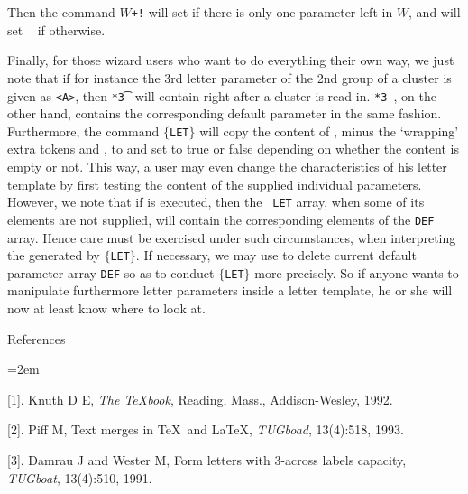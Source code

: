 {{\smooth Then the command
{\tt \string\testl@stline} {\tt $W$+!\string\s@fetymark }
will set {\tt \string\l@stlinetrue} if
there is only one parameter left in $W$, and will set {\tt
\string\l@stlinefalse} if otherwise. }



\medskip

Finally, for those wizard users who want to do everything their own way,
we just note that if for instance the 3rd letter parameter of the 2nd
group of a cluster is given as {\tt<A>}, then {\tt \string{}*3\t}
will contain {\tt \string\b@group \string{}\string\e@group}
right after a cluster is read in. {\tt \string{}*3\string~}, on the
other hand, contains the corresponding default parameter in the same
fashion. Furthermore, the command
{\tt\string\checkparas[$m$][$n$]$\{$LET$\}$} will copy the content of
{\tt\string\paras[$m$][$n$]}, minus the `wrapping' extra tokens
{\tt\string\b@group\string\relax} and {\tt\string\e@group}, to
{\tt\string\cachedata} and set {\tt\string\ifemptyparas} to true or
false depending on whether the content is empty or not. This way, a user
may even change the characteristics of his letter template by first
testing the content of the supplied individual parameters. However, we
note that if {\tt\string \loaddefaultparas} is executed, then the {\tt
LET} array, when some of its elements are not supplied, will contain the
corresponding elements of the {\tt DEF} array. Hence care must be
exercised under such circumstances, when interpreting the
{\tt\string\cachedata} generated by
{\tt\string\checkparas[$m$][$n$]$\{$LET$\}$}. If necessary, we may use
{\tt\string\delparadefaults} to delete current default parameter array
{\tt DEF} so as to conduct {\tt\string\checkparas$\{$LET$\}$} more
precisely. So if anyone wants to manipulate furthermore letter
parameters inside a letter template, he or she will now at least know
where to look at.

\bigskip
{\lbold References}

\smallskip
{\parindent=2em
\item{[1].} Knuth D E, {\sl The \TeX book}, Reading, Mass.,
Addison-Wesley, 1992. \par
\item{[2].} Piff M, Text merges in \TeX\ and \LaTeX, {\sl TUGboad},
13(4):518, 1993. \par
\item{[3].} Damrau J and Wester M, Form letters with 3-across
labels capacity, {\sl TUGboat}, 13(4):510, 1991.
\par
}


}
